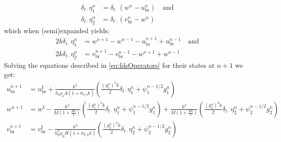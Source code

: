\documentclass{article}
\begin{document}
\begin{equation}
\begin{aligned}
    \delta_{t\cdot}\eta_1^n &= \delta_{t\cdot}(w^n - u_\text{br}^n) \quad \text{and}\\
    \delta_{t\cdot}\eta_2^n &= \delta_{t\cdot}(v_\text{br}^n - w^n)
    \end{aligned}
\end{equation}
which when (semi)expanded yields:
\begin{equation}\label{eq:expandedEtas}
\begin{aligned}
    2k\delta_{t\cdot}\eta_1^n &= w^{n+1}-w^{n-1}-u_\text{br}^{n+1}+u_\text{br}^{n-1} \quad \text{and}\\  2k\delta_{t\cdot}\eta_2^n &= v_\text{br}^{n+1}-v_\text{br}^{n-1}-w^{n+1}+w^{n-1}
    \end{aligned}
\end{equation}
Solving the equations described in \eqref{eq:fdsOperators} for their states at $n+1$ we get:
\begin{subequations}
\begin{align}
    u_\text{br}^{n+1} &= u_\text{br}^\text{I}
     +\frac{k^2}{h_\text{s}\rho_\text{s}A(1+\sigma_{0,\text{s}}k)}\left(\frac{(g_1^n)^2k}{2}\delta_{t\cdot}\eta_1^n+\psi_1^{n-1/2}g_1^n\right)\nonumber\\
    w^{n+1} &= w^\text{I}-\frac{k^2}{M\left(1+\frac{Rk}{2}\right)}\left(\frac{(g_1^n)^2k}{2}\delta_{t\cdot}\eta_1^n+\psi_1^{n-1/2}g_1^n\right)+\frac{k^2}{M\left(1+\frac{Rk}{2}\right)}\left(\frac{(g_2^n)^2k}{2}\delta_{t\cdot}\eta_2^n+\psi_2^{n-1/2}g_2^n\right)\nonumber\\
    v_\text{br}^{n+1} &= v_\text{br}^\text{I}-\frac{k^2}{h_\text{p}^2\rho_\text{p}H(1+\sigma_{0,\text{p}}k)}\left(\frac{(g_2^n)^2k}{2}\delta_{t\cdot}\eta_2^n+\psi_2^{n-1/2}g_2^n\right)\nonumber
\end{align}
\end{subequations}
\end{document}
